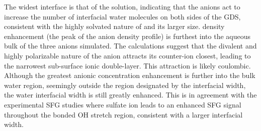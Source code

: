 The widest interface is that of the \sodsul solution, indicating that the \sul anions act to increase the number of interfacial water molecules on both sides of the GDS, consistent with the highly solvated nature of \sul and its larger size. \sul density enhancement (the peak of the anion density profile) is furthest into the aqueous bulk of the three anions simulated. The calculations suggest that the divalent and highly polarizable nature of the \sul anion attracts its counter-ion closest, leading to the narrowest sub-surface ionic double-layer. This attraction is likely coulombic. Although the greatest anionic concentration enhancement is further into the bulk water region, seemingly outside the region designated by the interfacial width, the water interfacial width is still greatly enhanced. This is in agreement with the experimental \sodsul SFG studies where sulfate ion leads to an enhanced SFG signal throughout the bonded OH stretch region, consistent with a larger interfacial width.\cite{McFearin2009}


